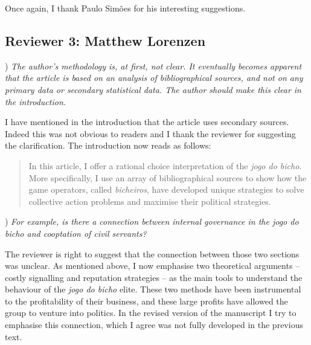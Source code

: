 \documentclass[a4paper,12pt]{article}
\begin{document}
\vspace{.5cm}

Once again, I thank Paulo Simões for his interesting suggestions.

\newpage

\subsection*{Reviewer 3: Matthew Lorenzen}%
\label{sub:reviewer_3_matthew_lorenzen}

) \textit{The author's methodology is, at first, not clear. It eventually becomes apparent that the article is based on an analysis of bibliographical sources, and not on any primary data or secondary statistical data. The author should make this clear in the introduction.}

\vspace{.25cm}

I have mentioned in the introduction that the article uses secondary sources. Indeed this was not obvious to readers and I thank the reviewer for suggesting the clarification. The introduction now reads as follows:

\begin{quote}
	In this article, I offer a rational choice interpretation of the \emph{jogo do bicho}. More specifically, I use an array of bibliographical sources to show how the game operators, called \emph{bicheiros}, have developed unique strategies to solve collective action problems and maximise their political strategies.
\end{quote}

\vspace{.5cm}

) \textit{For example, is there a connection between internal governance in the jogo do bicho and cooptation of civil servants?}

\vspace{.25cm}

The reviewer is right to suggest that the connection between those two sections was unclear. As mentioned above, I now emphasise two theoretical arguments -- costly signalling and reputation strategies -- as the main tools to understand the behaviour of the \textit{jogo do bicho} elite. These two methods have been instrumental to the profitability of their business, and these large profits have allowed the group to venture into politics. In the revised version of the manuscript I try to emphasise this connection, which I agree was not fully developed in the previous text. 
\end{document}
